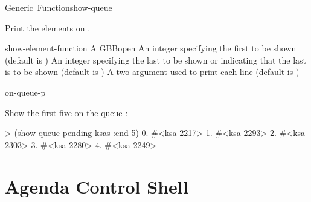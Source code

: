 \documentclass[10pt,twoside,english,pdftex]{article}
\begin{document}
\begin{functiondoc}{Generic~Function}{show-queue}{
     }
%
%
%

\fnsyntax

\fnpurpose Print the elements on .

\fnmethods
{}

\fnpackage {}

\fnmodule {}

\fnargs
\begin{args}{show-element-function}
\arg[queue] A GBBopen 
\arg[start] An integer specifying the first  to
be shown (default is )
\arg[end] An integer specifying the last  to
be shown or \nil{} indicating that the last  is
to be shown (default is \nil) 
 A two-argument  used to print each
 line (default is )
\end{args}

\begin{alsos}{on-queue-p}
\also[on-queue-p]
\end{alsos}

\fnexample
Show the first five  on the queue :
%
\W\supp
\begin{example}
> (show-queue pending-ksas :end 5)
    0. #<ksa 2217>
    1. #<ksa 2293>
    2. #<ksa 2303>
    3. #<ksa 2280>
    4. #<ksa 2249>
\end{example}

\end{functiondoc}


\W\renewcommand{\subsubentities}{}

\T\markright{}%
\T\pagestyle{plain}
\T\cleardoublepage
\W{}
\T\pagestyle{fancy}
\T\thispagestyle{fancybottom}
\T\global\def\fnlastname{ }%
\T\renewcommand{\headrulewidth}{0pt}
\section{Agenda Control Shell}
\end{document}
